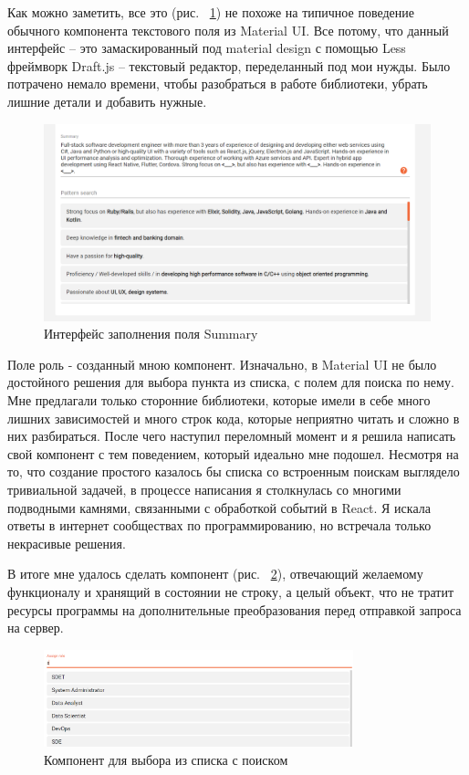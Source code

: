 \documentclass[a4paper,12pt]{diplom}
\begin{document}
Как можно заметить, все это (рис. ~\ref{7}) не похоже на типичное поведение обычного компонента текстового поля из Material UI. Все потому, что данный интерфейс -- это
замаскированный под material design с помощью Less фреймворк Draft.js -- текстовый редактор, переделанный под мои нужды. Было потрачено немало времени, чтобы разобраться в работе библиотеки,
убрать лишние детали и добавить нужные.

\begin{figure}[!ht]
	\centering
	\includegraphics[width=1\textwidth]{resources/summary.png}
	\caption{Интерфейс заполнения поля Summary}
	\label{7}
\end{figure}

Поле роль - созданный мною компонент. Изначально, в Material UI не было достойного решения для выбора пункта из списка, с полем для поиска по нему.
Мне предлагали только сторонние библиотеки, которые имели в себе много лишних зависимостей и много строк кода, которые неприятно читать и сложно в них разбираться.
После чего наступил переломный момент и я решила написать свой компонент с тем поведением, который идеально мне подошел. Несмотря на то, что создание простого казалось бы списка со встроенным поискам выглядело тривиальной задачей, 
в процессе написания я столкнулась со многими подводными камнями, связанными с обработкой событий в React. Я искала ответы в интернет сообществах по программированию,
но встречала только некрасивые решения. 

В итоге мне удалось сделать компонент (рис. ~\ref{8}), отвечающий желаемому функционалу и хранящий в состоянии не строку, а целый объект, что
не тратит ресурсы программы на дополнительные преобразования перед отправкой запроса на сервер.

\begin{figure}[!ht]
	\centering
	\includegraphics[width=0.8\textwidth]{resources/role.png}
	\caption{Компонент для выбора из списка с поиском}
	\label{8}
\end{figure}
\end{document}
